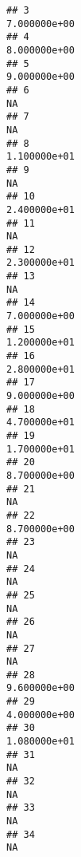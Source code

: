 \documentclass[
]{article}
\begin{document}
\begin{verbatim}
## 3                                                                 7.000000e+00
## 4                                                                 8.000000e+00
## 5                                                                 9.000000e+00
## 6                                                                           NA
## 7                                                                           NA
## 8                                                                 1.100000e+01
## 9                                                                           NA
## 10                                                                2.400000e+01
## 11                                                                          NA
## 12                                                                2.300000e+01
## 13                                                                          NA
## 14                                                                7.000000e+00
## 15                                                                1.200000e+01
## 16                                                                2.800000e+01
## 17                                                                9.000000e+00
## 18                                                                4.700000e+01
## 19                                                                1.700000e+01
## 20                                                                8.700000e+00
## 21                                                                          NA
## 22                                                                8.700000e+00
## 23                                                                          NA
## 24                                                                          NA
## 25                                                                          NA
## 26                                                                          NA
## 27                                                                          NA
## 28                                                                9.600000e+00
## 29                                                                4.000000e+00
## 30                                                                1.080000e+01
## 31                                                                          NA
## 32                                                                          NA
## 33                                                                          NA
## 34                                                                          NA

\end{verbatim}
\end{document}
